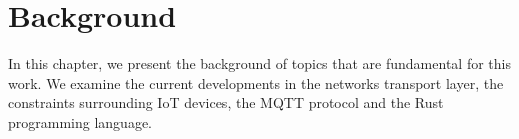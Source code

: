 \chapter{Background} \label{chap:back}

In this chapter, we present the background of topics that are fundamental for this work.
We examine the current developments in the networks transport layer, the constraints surrounding IoT devices, the MQTT protocol and the Rust programming language.




